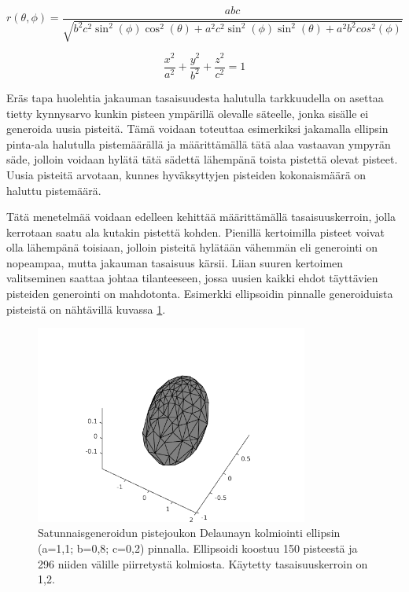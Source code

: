 \documentclass[12pt,a4paper,titlepage]{article}
\begin{document}
\begin{equation}\label{r}
	r(\theta,\phi) = \frac{abc}{\sqrt{b^2c^2\sin^2(\phi)\cos^2(\theta)+a^2c^2\sin^2(\phi)\sin^2(\theta)+a^2b^2cos^2(\phi)}}
\end{equation}

\begin{equation}\label{ellipsin-yhtalo}
	\frac{x^2}{a^2}+\frac{y^2}{b^2}+\frac{z^2}{c^2} = 1
\end{equation}

Eräs tapa huolehtia jakauman tasaisuudesta halutulla tarkkuudella on asettaa tietty kynnysarvo kunkin pisteen ympärillä olevalle säteelle, jonka sisälle ei generoida uusia pisteitä. Tämä voidaan toteuttaa esimerkiksi jakamalla ellipsin pinta-ala halutulla pistemäärällä ja määrittämällä tätä alaa vastaavan ympyrän säde, jolloin voidaan hylätä tätä sädettä lähempänä toista pistettä olevat pisteet. Uusia pisteitä arvotaan, kunnes hyväksyttyjen pisteiden kokonaismäärä on haluttu pistemäärä.

Tätä menetelmää voidaan edelleen kehittää määrittämällä tasaisuuskerroin, jolla kerrotaan saatu ala kutakin pistettä kohden. Pienillä kertoimilla pisteet voivat olla lähempänä toisiaan, jolloin pisteitä hylätään vähemmän eli generointi on nopeampaa, mutta jakauman tasaisuus kärsii. Liian suuren kertoimen valitseminen saattaa johtaa tilanteeseen, jossa uusien kaikki ehdot täyttävien pisteiden generointi on mahdotonta. Esimerkki ellipsoidin pinnalle generoiduista pisteistä on nähtävillä kuvassa \ref{satunnaisellipsoidi}.

\begin{figure}
  \centering
  \includegraphics[width=0.8\textwidth]{../Delaunay/data/ellipsoidi150/ellipsoidi.png}
  \caption{Satunnaisgeneroidun pistejoukon Delaunayn kolmiointi ellipsin (a=1,1; b=0,8; c=0,2) pinnalla. Ellipsoidi koostuu 150 pisteestä ja 296 niiden välille piirretystä kolmiosta. Käytetty tasaisuuskerroin on 1,2.}
  \label{satunnaisellipsoidi}
\end{figure}
\end{document}
